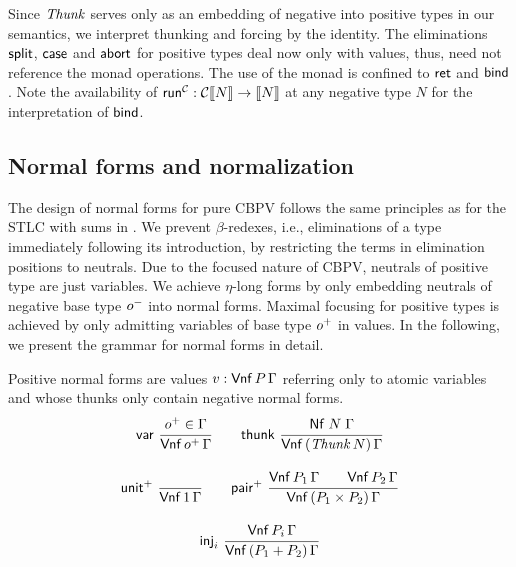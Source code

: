 \documentclass[sigconf,screen,fleqn]{acmart} %
\begin{document}
Since $\mathit{Thunk}$ serves only as an embedding of negative into positive
types in our semantics,
we interpret thunking and forcing by the identity.
The eliminations $\mathsf{split}$, $\mathsf{case}$ and $\mathsf{abort}$
for positive types deal now only with values, thus,
need not reference the monad operations.
The use of the monad is confined to $\mathsf{ret}$ and $\mathsf{bind}$.
Note the availability of $\mathsf{run}^{\mathcal{C}} : \mathcal{C} \mathopen{{[\kern-0.14em[}} N \mathclose{{]\kern-0.14em]}} \to \mathopen{{[\kern-0.14em[}} N \mathclose{{]\kern-0.14em]}}$
at any negative type $N$ for the interpretation of $\mathsf{bind}$.

\subsection{Normal forms and normalization}

The design of normal forms for pure CBPV follows the same principles
as for the STLC with sums in .  We prevent
$\beta$-redexes, i.e., eliminations of a type immediately following
its introduction, by restricting the terms in elimination positions to
neutrals.  Due to the focused nature of CBPV, neutrals of positive
type are just variables.  We achieve $\eta$-long forms by only
embedding neutrals of negative base type $o^-$ into normal forms.
Maximal focusing for positive types is achieved by only admitting
variables of base type $o^+$ in values.
In the following, we present the
grammar for normal forms in detail.

Positive normal forms are values $v : \mathsf{Vnf}\,P\,\Gamma$
referring only to atomic variables and
whose thunks only
contain negative normal forms.
\begin{gather*}
  \nru{\tvar}{\patom \in \Gamma}{\PValNf {\patom} \Gamma}
\qquad
  \nru{\tthunk}{\Nf N \Gamma}{\PValNfP{\Thunk N}\Gamma}
\\[2ex]
  \nru{\punit}{}{\PValNf{\tyone}\Gamma}
\qquad
  \nru{\ppair}
      {\PValNf{P_1}\Gamma \qquad \PValNf{P_2}\Gamma}
      {\PValNfP{P_1 \times P_2}\Gamma}
\\[2ex]
  \nru{\tinj_i}{\PValNf{P_i}\Gamma}{\PValNfP{P_1 + P_2}\Gamma}
\end{gather*}
\end{document}
